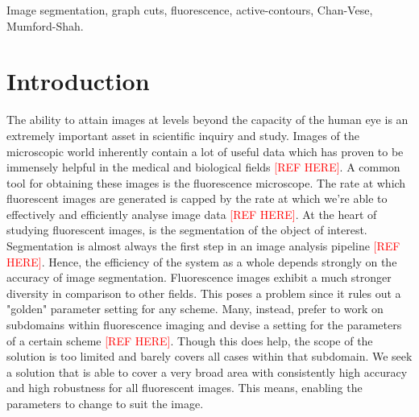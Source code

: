 \documentclass[10pt, journal, letterpaper, onecolumn, draftcls]{IEEEtran}
\begin{document}
\begin{IEEEkeywords}
Image segmentation, graph cuts, fluorescence, active-contours, Chan-Vese, Mumford-Shah.
\end{IEEEkeywords}






%



\section{Introduction}
\label{sec:Intro}
The ability to attain images at levels beyond the capacity of the human eye is an extremely important asset in scientific inquiry and study. Images of the microscopic world inherently contain a lot of useful data which has proven to be immensely helpful in the medical and biological fields \textcolor{red}{[REF HERE]}. A common tool for obtaining these images is the fluorescence microscope. The rate at which fluorescent images are generated is capped by the rate at which we're able to effectively and efficiently analyse image data \textcolor{red}{[REF HERE]}. At the heart of studying fluorescent images, is the segmentation of the object of interest.
Segmentation is almost always the first step in an image analysis pipeline \textcolor{red}{[REF HERE]}. Hence, the efficiency of the system as a whole depends strongly on the accuracy of image segmentation.
Fluorescence images exhibit a much stronger diversity in comparison to other fields. This poses a problem since it rules out a "golden" parameter setting for any scheme. Many, instead, prefer to work on subdomains within fluorescence imaging and devise a setting for the parameters of a certain scheme \textcolor{red}{[REF HERE]}. Though this does help, the scope of the solution is too limited and barely covers all cases within that subdomain. We seek a solution that is able to cover a very broad area with consistently high accuracy and high robustness for all fluorescent images. This means, enabling the parameters to change to suit the image.
\end{document}
